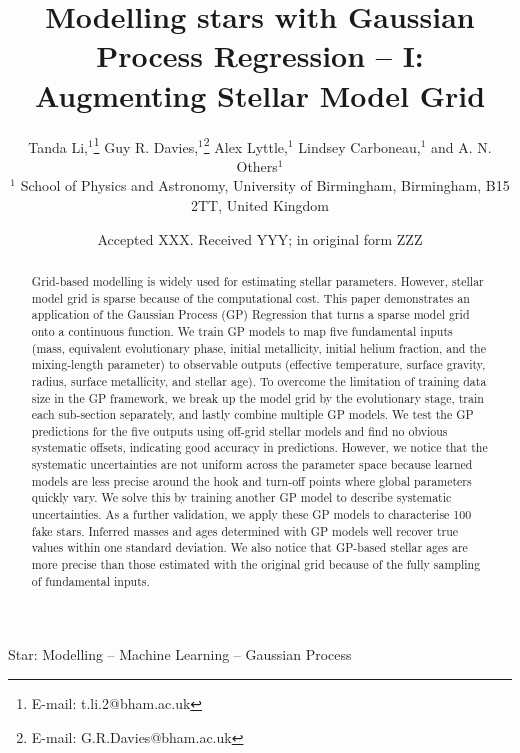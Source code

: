 \documentclass[fleqn,usenatbib]{mnras}
\title[Modelling stars with GP]{Modelling stars with Gaussian Process Regression -- I:  Augmenting Stellar Model Grid}
\author[T. Li et al.]{
Tanda Li,$^{1}$\thanks{E-mail: t.li.2@bham.ac.uk}
Guy R. Davies,$^{1}$\thanks{E-mail: G.R.Davies@bham.ac.uk}
Alex Lyttle,$^{1}$
Lindsey Carboneau,$^{1}$
and A. N. Others$^{1}$
\\
$^{1}$ School of Physics and Astronomy, University of Birmingham, Birmingham, B15 2TT, United Kingdom\\
}
\date{Accepted XXX. Received YYY; in original form ZZZ}
\begin{document}
\label{firstpage}
\pagerange{\pageref{firstpage}--\pageref{lastpage}}
\maketitle

\begin{abstract}
Grid-based modelling is widely used for estimating stellar parameters. However, stellar model grid is sparse because of the computational cost. This paper demonstrates an application of the Gaussian Process (GP) Regression that turns a sparse model grid onto a continuous function. We train GP models to map five fundamental inputs (mass, equivalent evolutionary phase, initial metallicity, initial helium fraction, and the mixing-length parameter) to observable outputs (effective temperature, surface gravity, radius, surface metallicity, and stellar age). To overcome the limitation of training data size in the GP framework, we break up the model grid by the evolutionary stage, train each sub-section separately, and lastly combine multiple GP models. 
%
%
We test the GP predictions for the five outputs using off-grid stellar models and find no obvious systematic offsets, indicating good accuracy in predictions. However, we notice that the systematic uncertainties are not uniform across the parameter space because learned models are less precise around the hook and turn-off points where global parameters quickly vary. We solve this by training another GP model to describe systematic uncertainties. 
%
As a further validation, we apply these GP models to characterise 100 fake stars. Inferred masses and ages determined with GP models well recover true values within one standard deviation. We also notice that GP-based stellar ages are more precise than those estimated with the original grid because of the fully sampling of fundamental inputs.   
%
\end{abstract}

\begin{keywords}
Star: Modelling -- Machine Learning -- Gaussian Process
\end{keywords}
\end{document}
